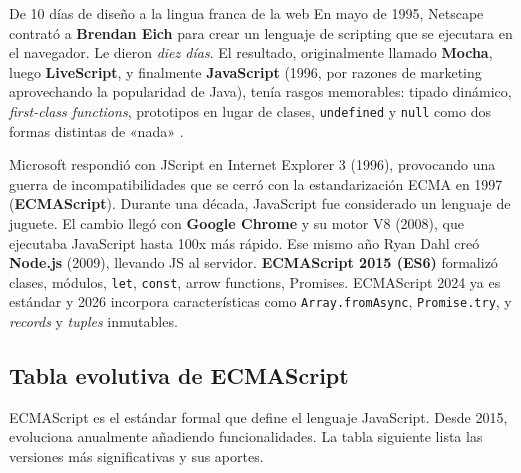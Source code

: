 \begin{cajahistoria}{De 10 días de diseño a la lingua franca de la web}
En mayo de 1995, Netscape contrató a \textbf{Brendan Eich} para
crear un lenguaje de scripting que se ejecutara en el navegador.
Le dieron \emph{diez días}. El resultado, originalmente llamado
\textbf{Mocha}, luego \textbf{LiveScript}, y finalmente
\textbf{JavaScript} (1996, por razones de marketing aprovechando la
popularidad de Java), tenía rasgos memorables: tipado dinámico,
\emph{first-class functions}, prototipos en lugar de clases,
\texttt{undefined} y \texttt{null} como dos formas distintas de
«nada» \cite{crockford2008javascript}.

Microsoft respondió con JScript en Internet Explorer 3 (1996),
provocando una guerra de incompatibilidades que se cerró con la
estandarización ECMA en 1997 (\textbf{ECMAScript}). Durante una
década, JavaScript fue considerado un lenguaje de juguete. El cambio
llegó con \textbf{Google Chrome} y su motor V8 (2008), que ejecutaba
JavaScript hasta 100x más rápido. Ese mismo año Ryan Dahl creó
\textbf{Node.js} (2009), llevando JS al servidor. \textbf{ECMAScript
2015 (ES6)} formalizó clases, módulos, \texttt{let}, \texttt{const},
arrow functions, Promises. ECMAScript 2024 ya es estándar y 2026
\cite{ecma2024} incorpora características como \texttt{Array.fromAsync},
\texttt{Promise.try}, y \emph{records} y \emph{tuples} inmutables.
\end{cajahistoria}

\subsection{Tabla evolutiva de ECMAScript}

ECMAScript es el estándar formal que define el lenguaje
JavaScript. Desde 2015, evoluciona anualmente añadiendo
funcionalidades. La tabla siguiente lista las versiones más
significativas y sus aportes.


